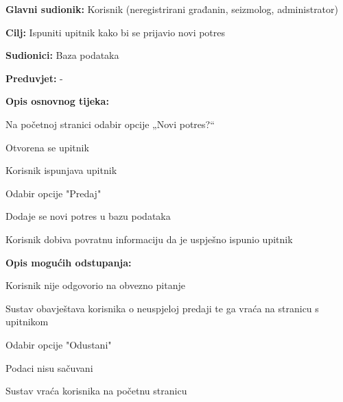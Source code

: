 			\noindent {}
			\begin{packed_item}
				
				\item \textbf{Glavni sudionik:} Korisnik (neregistrirani građanin, seizmolog, administrator)
				\item \textbf{Cilj:} Ispuniti upitnik kako bi se prijavio novi potres
				\item \textbf{Sudionici:} Baza podataka
				\item \textbf{Preduvjet:} -
				
				\item \textbf{Opis osnovnog tijeka:}
				
				\item[] \begin{packed_enum}
					\item Na početnoj stranici odabir opcije „Novi potres?“
					\item Otvorena se upitnik
					\item Korisnik ispunjava upitnik
					\item Odabir opcije "Predaj"
					\item Dodaje se novi potres u bazu podataka
					\item Korisnik dobiva povratnu informaciju da je uspješno ispunio upitnik
				\end{packed_enum}
				
				\item  \textbf{Opis mogućih odstupanja:}
				
				\item[] \begin{packed_item}
					
					\item[3.a] Korisnik nije odgovorio na obvezno pitanje
					\item[] \begin{packed_enum}
						
						\item Sustav obavještava korisnika o neuspjeloj predaji te ga vraća na stranicu s upitnikom						
					\end{packed_enum}
					
					\item[4.a] Odabir opcije "Odustani"
					\item[] \begin{packed_enum}
						
						\item Podaci nisu sačuvani
						\item Sustav vraća korisnika na početnu stranicu						
					\end{packed_enum}
					
				\end{packed_item}
				
			\end{packed_item}
			
